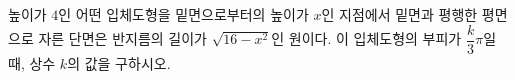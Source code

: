 \hspace*{2mm}\begin{minipage}[t]{\dimexpr\linewidth-2mm\relax}\vspace{0pt}
높이가 $4$인 어떤 입체도형을 밑면으로부터의 높이가 $x$인 지점에서 밑면과 평행한 평면으로 자른 단면은 반지름의 길이가 $\sqrt{16-x^2}$인 원이다. 이 입체도형의 부피가 $\dfrac{k}{3}\pi$일 때, 상수 $k$의 값을 구하시오.\end{minipage}
